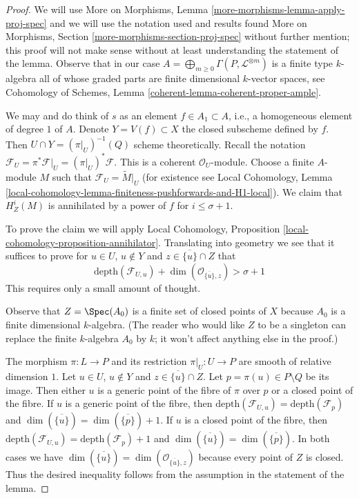 \begin{proof}
We will use More on Morphisms, Lemma \ref{more-morphisms-lemma-apply-proj-spec}
and we will use the notation used and results found
More on Morphisms, Section \ref{more-morphisms-section-proj-spec}
without further mention; this proof will not make sense without
at least understanding the statement of the lemma.
Observe that in our case
$A = \bigoplus_{m \geq 0} \Gamma(P, \mathcal{L}^{\otimes m})$
is a finite type $k$-algebra
all of whose graded parts are finite dimensional $k$-vector spaces, see
Cohomology of Schemes, Lemma \ref{coherent-lemma-coherent-proper-ample}.

\medskip\noindent
We may and do think of $s$ as an element $f \in A_1 \subset A$, i.e.,
a homogeneous element of degree $1$ of $A$. Denote
$Y = V(f) \subset X$ the closed subscheme defined by $f$.
Then $U \cap Y = (\pi|_U)^{-1}(Q)$ scheme theoretically.
Recall the notation
$\mathcal{F}_U = \pi^*\mathcal{F}|_U = (\pi|_U)^*\mathcal{F}$.
This is a coherent $\mathcal{O}_U$-module.
Choose a finite $A$-module $M$ such that
$\mathcal{F}_U = \widetilde{M}|_U$
(for existence see Local Cohomology, Lemma
\ref{local-cohomology-lemma-finiteness-pushforwards-and-H1-local}).
We claim that $H^i_Z(M)$ is annihilated by
a power of $f$ for $i \leq \sigma + 1$.

\medskip\noindent
To prove the claim we will apply
Local Cohomology, Proposition \ref{local-cohomology-proposition-annihilator}.
Translating into geometry we see that it suffices to prove
for $u \in U$, $u \not \in Y$ and $z \in \overline{\{u\}} \cap Z$
that
$$
\text{depth}(\mathcal{F}_{U, u}) +
\dim(\mathcal{O}_{\overline{\{u\}}, z}) > \sigma + 1
$$
This requires only a small amount of thought.

\medskip\noindent
Observe that $Z = \Spec(A_0)$ is a finite set of closed points of $X$ because
$A_0$ is a finite dimensional $k$-algebra.
(The reader who would like $Z$ to be a singleton can replace the
finite $k$-algebra $A_0$ by $k$; it won't affect anything else in the proof.)

\medskip\noindent
The morphism $\pi : L \to P$ and its restriction $\pi|_U : U \to P$
are smooth of relative dimension $1$.
Let $u \in U$, $u \not \in Y$ and $z \in \overline{\{u\}} \cap Z$.
Let $p = \pi(u) \in P \setminus Q$ be its image.
Then either $u$ is a generic
point of the fibre of $\pi$ over $p$ or a closed point of the fibre.
If $u$ is a generic point of the fibre, then
$\text{depth}(\mathcal{F}_{U, u}) = \text{depth}(\mathcal{F}_p)$
and
$\dim(\overline{\{u\}}) = \dim(\overline{\{p\}}) + 1$.
If $u$ is a closed point of the fibre, then
$\text{depth}(\mathcal{F}_{U, u}) = \text{depth}(\mathcal{F}_p) + 1$
and
$\dim(\overline{\{u\}}) = \dim(\overline{\{p\}})$.
In both cases we have
$\dim(\overline{\{u\}}) = \dim(\mathcal{O}_{\overline{\{u\}}, z})$
because every point of $Z$ is closed. Thus the desired
inequality follows from the assumption in the statement of
the lemma.


\end{proof}
